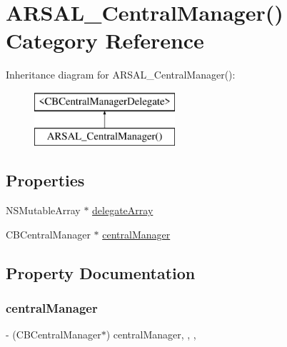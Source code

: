 \hypertarget{categoryARSAL__CentralManager_07_08}{}\section{A\+R\+S\+A\+L\+\_\+\+Central\+Manager() Category Reference}
\label{categoryARSAL__CentralManager_07_08}
Inheritance diagram for A\+R\+S\+A\+L\+\_\+\+Central\+Manager()\+:\begin{figure}[H]
\begin{center}
\leavevmode
\includegraphics[height=2.000000cm]{categoryARSAL__CentralManager_07_08}
\end{center}
\end{figure}
\subsection*{Properties}
\begin{DoxyCompactItemize}
\item 
N\+S\+Mutable\+Array $\ast$ \hyperlink{categoryARSAL__CentralManager_07_08_a23828b5d378b496dd4f9950e15dee279}{delegate\+Array}
\item 
C\+B\+Central\+Manager $\ast$ \hyperlink{categoryARSAL__CentralManager_07_08_a7167856719a11298daa2ddcb610cc3b9}{central\+Manager}
\end{DoxyCompactItemize}


\subsection{Property Documentation}
\hypertarget{categoryARSAL__CentralManager_07_08_a7167856719a11298daa2ddcb610cc3b9}{}\label{categoryARSAL__CentralManager_07_08_a7167856719a11298daa2ddcb610cc3b9} 
\subsubsection{\texorpdfstring{central\+Manager}{centralManager}}
{\footnotesize\ttfamily -\/ (C\+B\+Central\+Manager$\ast$) central\+Manager\hspace{0.3cm}{\ttfamily [read]}, {\ttfamily [write]}, {\ttfamily [nonatomic]}, {\ttfamily [strong]}}

